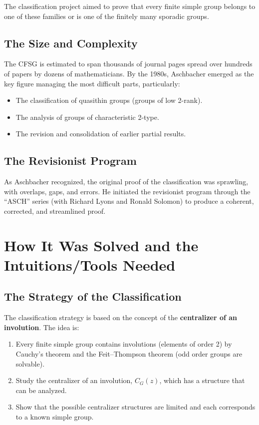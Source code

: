 The classification project aimed to prove that every finite simple group belongs to one of these families or is one of the finitely many sporadic groups.

\subsection{The Size and Complexity}

The CFSG is estimated to span thousands of journal pages spread over hundreds of papers by dozens of mathematicians. By the 1980s, Aschbacher emerged as the key figure managing the most difficult parts, particularly:
\begin{itemize}
    \item The classification of quasithin groups (groups of low 2-rank).
    \item The analysis of groups of characteristic 2-type.
    \item The revision and consolidation of earlier partial results.
\end{itemize}

\subsection{The Revisionist Program}

As Aschbacher recognized, the original proof of the classification was sprawling, with overlaps, gaps, and errors. He initiated the revisionist program through the ``ASCH'' series (with Richard Lyons and Ronald Solomon) to produce a coherent, corrected, and streamlined proof.

\section{How It Was Solved and the Intuitions/Tools Needed}

\subsection{The Strategy of the Classification}

The classification strategy is based on the concept of the \textbf{centralizer of an involution}. The idea is:
\begin{enumerate}
    \item Every finite simple group contains involutions (elements of order 2) by Cauchy's theorem and the Feit--Thompson theorem (odd order groups are solvable).
    \item Study the centralizer of an involution, $C_G(z)$, which has a structure that can be analyzed.
    \item Show that the possible centralizer structures are limited and each corresponds to a known simple group.
\end{enumerate}

